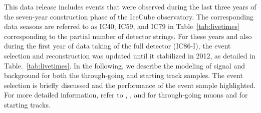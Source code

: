 \documentclass[aps,10pt,prd,twocolumn,floats,letterpaper,showpacs,nofootinbib,bibnotes,notitlepage,superscriptaddress,floatfix]{revtex4-1}
\newcommand{\MA}[1]{{\color{magenta}#1}}
\begin{document}
This data release includes events that were observed during the last three years of the seven-year construction phase of the IceCube observatory. The corresponding data seasons are referred to as IC40, IC59, and IC79 in Table~\ref{tab:livetimes} corresponding to the partial number of detector strings. For these years and also during the first year of data taking of the full detector (IC86-I), the event selection and reconstruction was updated until it stabilized in 2012, as detailed in Table.~\ref{tab:livetimes}. In the following, we describe the modeling of signal and background for both the through-going and starting track samples.  The event selection is briefly discussed and the performance of the event sample highlighted. For more detailed information, refer to \cite{Abbasi:2010rd}, \cite{Aartsen:2013uuv}, and \cite{Aartsen:2014cva} for through-going muons and \cite{Aartsen:2016tpb} for starting tracks.



\end{document}

